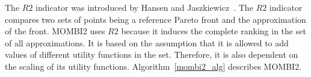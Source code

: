 The $R2$ indicator was introduced by Hansen and Jaszkiewicz~\cite{trautmann2013r2}. The $R2$ indicator compares two sets of points being a reference Pareto front and the approximation of the front. %
%
%
MOMBI2 uses $R2$ because it induces the complete ranking in the set of all approximations. It is based on the assumption that it is allowed to add values of different utility functions in the set. Therefore, it is also dependent on the scaling of its utility functions. %
%
%
Algorithm~\ref{mombi2_alg} describes MOMBI2.


